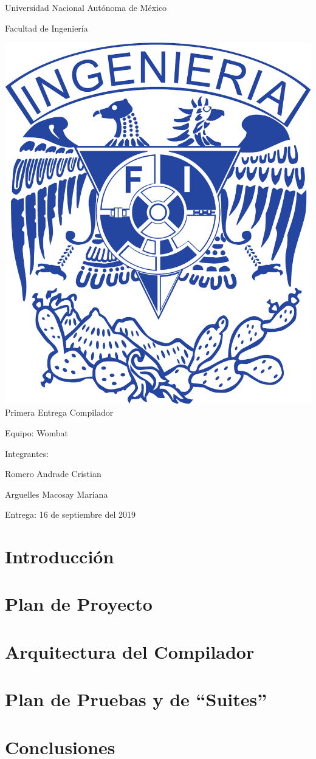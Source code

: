 \documentclass{article}
\begin{document}
\begin{titlepage}
  \begin{center}
    \Huge{Universidad Nacional Autónoma de México}

    \Huge{Facultad de Ingeniería}
    \vfill

    \includegraphics[scale=.3]{../img/UNAM_INGENIERIA}
    \vfill
    \Large{Primera Entrega Compilador}

    
    \vfill
    \LARGE{Equipo: Wombat}
    \vfill
  \end{center}  
  
  \Large{Integrantes:
    
    \hspace{2cm}Romero Andrade Cristian
    
    \hspace{2cm}Arguelles Macosay Mariana}
  \vfill
  \Large{Entrega: 16 de septiembre del 2019}
  

  
  
\end{titlepage}

\section{Introducción}

\section{Plan de Proyecto}

\section{Arquitectura del Compilador}

\section{Plan de Pruebas y de ``Suites''}

\section{Conclusiones}
\end{document}
